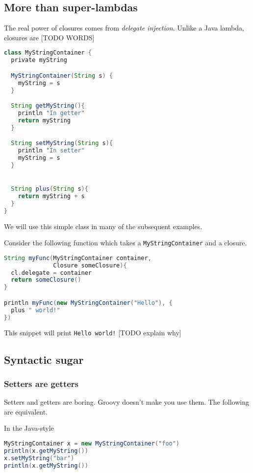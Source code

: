 \documentclass[]{article}
\theoremstyle{definition}
\newcommand{\startSnippetFig}{%
\begin{snippet}[t]
  \begin{minipage}[c]{.6\textwidth}
    \begin{framed}
}
\newcommand{\stopSnippetFig}{%
    \end{framed}
  \end{minipage}
\end{snippet}
}
\begin{document}
\subsection{More than super-lambdas}
\label{sec:super-lambdas}
The real power of closures comes from \emph{delegate injection}.
Unlike a Java lambda, closures are [TODO WORDS]

\startSnippetFig
\begin{lstlisting}[language=Groovy]
class MyStringContainer {
  private myString

  MyStringContainer(String s) {
    myString = s
  }

  String getMyString(){
    println "In getter"
    return myString
  }

  String setMyString(String s){
    println "In setter"
    myString = s
  }


  String plus(String s){
    return myString + s
  }
}
\end{lstlisting}
    \caption{We will use this simple class in many of the subsequent examples.}
    \label{snip:container}
\stopSnippetFig


Consider the following function which takes a \texttt{MyStringContainer} and a closure.

\startSnippetFig
\begin{lstlisting}[language=Groovy]
String myFunc(MyStringContainer container,
              Closure someClosure){
  cl.delegate = container
  return someClosure()
}

println myFunc(new MyStringContainer("Hello"), {
  plus " world!"
})
\end{lstlisting}
\end{framed}
\end{minipage}
\end{snippet}

This snippet will print \texttt{Hello world!}  [TODO explain why]

\subsection{Syntactic sugar}
\subsubsection{Setters are getters}

Setters and getters are boring.
Groovy doesn't make you use them.
The following are equivalent.

In the Java-style
\begin{lstlisting}[language=Groovy]
MyStringContainer x = new MyStringContainer("foo")
println(x.getMyString())
x.setMyString("bar")
println(x.getMyString())
\end{lstlisting}
\end{document}
